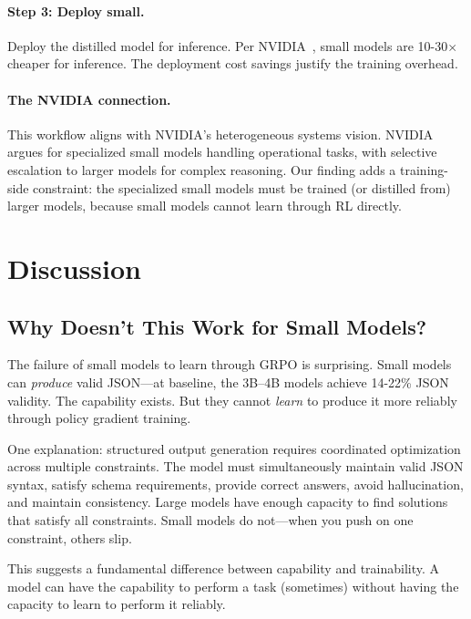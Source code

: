 \documentclass[11pt]{article}
\begin{document}
\paragraph{Step 3: Deploy small.}
Deploy the distilled model for inference.
Per NVIDIA~\citep{nvidia2025slm}, small models are 10-30$\times$ cheaper for inference.
The deployment cost savings justify the training overhead.

\paragraph{The NVIDIA connection.}
This workflow aligns with NVIDIA's heterogeneous systems vision.
NVIDIA argues for specialized small models handling operational tasks, with selective escalation to larger models for complex reasoning.
Our finding adds a training-side constraint: the specialized small models must be trained (or distilled from) larger models, because small models cannot learn through RL directly.

\section{Discussion}
\label{sec:discussion}

\subsection{Why Doesn't This Work for Small Models?}

The failure of small models to learn through GRPO is surprising.
Small models can \emph{produce} valid JSON---at baseline, the 3B--4B models achieve 14-22\% JSON validity.
The capability exists.
But they cannot \emph{learn} to produce it more reliably through policy gradient training.

One explanation: structured output generation requires coordinated optimization across multiple constraints.
The model must simultaneously maintain valid JSON syntax, satisfy schema requirements, provide correct answers, avoid hallucination, and maintain consistency.
Large models have enough capacity to find solutions that satisfy all constraints.
Small models do not---when you push on one constraint, others slip.

This suggests a fundamental difference between capability and trainability.
A model can have the capability to perform a task (sometimes) without having the capacity to learn to perform it reliably.
\end{document}
